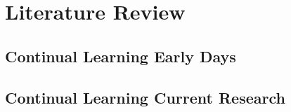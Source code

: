 
\chapter{Literature Review}

\section{Continual Learning Early Days}

\section{Continual Learning Current Research}